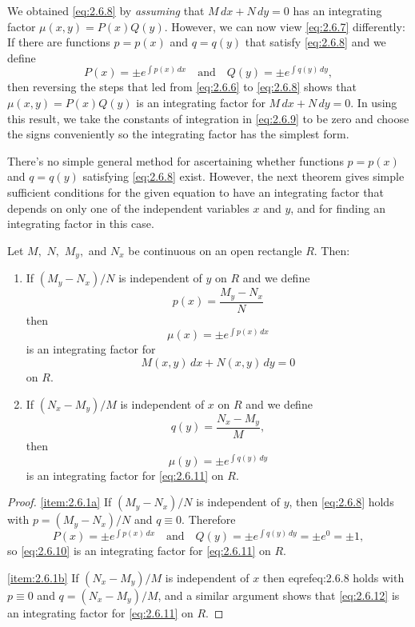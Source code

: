 \documentclass{ximera}
\begin{document}
We obtained \eqref{eq:2.6.8} by \textit{assuming} that $M\,dx+N\,dy=0$ has
an integrating factor $\mu(x,y)=P(x)Q(y)$. However, we can
now view \eqref{eq:2.6.7} differently: If there are functions $p=p(x)$
and $q=q(y)$  that satisfy \eqref{eq:2.6.8} and we define
\begin{equation} \label{eq:2.6.9}
P(x)=\pm e^{\int p(x)\,dx}\quad\text{and}\quad
Q(y)=\pm e^{\int q(y)\,dy},
\end{equation}
then reversing the steps that led from \eqref{eq:2.6.6} to
\eqref{eq:2.6.8} shows that $\mu(x,y)=P(x)Q(y)$ is an integrating factor
for $M\,dx+N\,dy=0$. In using this result, we take the constants of
integration in \eqref{eq:2.6.9} to be zero and choose the signs
conveniently so the integrating factor has the simplest form.

There's no simple general method for ascertaining
whether functions $p=p(x)$ and $q=q(y)$ satisfying \eqref{eq:2.6.8}
exist. However, the next theorem gives simple sufficient
conditions for the given equation to have an integrating factor that
depends on only one of the independent variables $x$ and $y$, and for
finding an integrating factor in this case.

\begin{theorem}\label{thmtype:2.6.1}
Let $M,$ $N,$ $M_y,$ and $N_x$ be continuous on an open rectangle $R.$
Then:
\begin{enumerate}
\item \label{item:2.6.1a} %
 If $(M_y-N_x)/N$ is independent
of $y$ on $R$ and  we define
$$
p(x)=\frac{M_y-N_x}{N}
$$
 then
\begin{equation}\label{eq:2.6.10}
\mu(x)=\pm e^{\int p(x)\,dx}
\end{equation}
is an integrating factor for
\begin{equation}\label{eq:2.6.11}
M(x,y)\,dx+N(x,y)\,dy=0
\end{equation}
on $R.$
\item \label{item:2.6.1b} %
If $(N_x-M_y)/M$ is independent of $x$ on
$R$ and we define
$$
q(y)=\frac{N_x-M_y}{M},
$$
then
\begin{equation}\label{eq:2.6.12}
\mu(y)=\pm e^{\int q(y)\,dy}
\end{equation}
 is an integrating factor for \eqref{eq:2.6.11} on $R.$
\end{enumerate}
\end{theorem}



\begin{proof} \ref{item:2.6.1a}
If $(M_y-N_x)/N$ is independent of $y$, then \eqref{eq:2.6.8}
 holds with $p=(M_y-N_x)/N$ and $q\equiv0$. Therefore
 $$
P(x)=\pm e^{\int p(x)\,dx}\quad\text{and}\quad Q(y)=\pm e^{\int
q(y)\,dy}=\pm e^0=\pm1,
 $$
so \eqref{eq:2.6.10} is an integrating factor for \eqref{eq:2.6.11} on $R$.

\ref{item:2.6.1b} If $(N_x-M_y)/M$ is independent of $x$ then eqref{eq:2.6.8} holds
with $p\equiv0$ and $q=(N_x-M_y)/M$, and a similar argument shows that
\eqref{eq:2.6.12} is an integrating factor for \eqref{eq:2.6.11} on $R$.
\end{proof}
\end{document}

